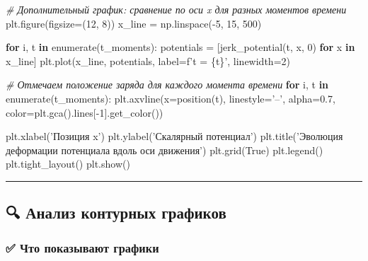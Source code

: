 \documentclass[11pt]{article}
\newenvironment{Shaded}{}{}
\newcommand{\KeywordTok}[1]{\textcolor[rgb]{0.00,0.44,0.13}{\textbf{{#1}}}}
\newcommand{\DecValTok}[1]{\textcolor[rgb]{0.25,0.63,0.44}{{#1}}}
\newcommand{\FloatTok}[1]{\textcolor[rgb]{0.25,0.63,0.44}{{#1}}}
\newcommand{\StringTok}[1]{\textcolor[rgb]{0.25,0.44,0.63}{{#1}}}
\newcommand{\CommentTok}[1]{\textcolor[rgb]{0.38,0.63,0.69}{\textit{{#1}}}}
\newcommand{\NormalTok}[1]{{#1}}
\newcommand{\SpecialCharTok}[1]{\textcolor[rgb]{0.25,0.44,0.63}{{#1}}}
\newcommand{\SpecialStringTok}[1]{\textcolor[rgb]{0.73,0.40,0.53}{{#1}}}
\newcommand{\VariableTok}[1]{\textcolor[rgb]{0.10,0.09,0.49}{{#1}}}
\newcommand{\ControlFlowTok}[1]{\textcolor[rgb]{0.00,0.44,0.13}{\textbf{{#1}}}}
\newcommand{\OperatorTok}[1]{\textcolor[rgb]{0.40,0.40,0.40}{{#1}}}
\newcommand{\BuiltInTok}[1]{{#1}}
\begin{document}
\begin{Shaded}
\begin{Highlighting}[]
\CommentTok{# Дополнительный график: сравнение по оси x для разных моментов времени}
\NormalTok{plt.figure(figsize}\OperatorTok{=}\NormalTok{(}\DecValTok{12}\NormalTok{, }\DecValTok{8}\NormalTok{))}
\NormalTok{x_line }\OperatorTok{=}\NormalTok{ np.linspace(}\OperatorTok{-}\DecValTok{5}\NormalTok{, }\DecValTok{15}\NormalTok{, }\DecValTok{500}\NormalTok{)}

\ControlFlowTok{for}\NormalTok{ i, t }\KeywordTok{in} \BuiltInTok{enumerate}\NormalTok{(t_moments):}
\NormalTok{    potentials }\OperatorTok{=}\NormalTok{ [jerk_potential(t, x, }\DecValTok{0}\NormalTok{) }\ControlFlowTok{for}\NormalTok{ x }\KeywordTok{in}\NormalTok{ x_line]}
\NormalTok{    plt.plot(x_line, potentials, label}\OperatorTok{=}\SpecialStringTok{f't = }\SpecialCharTok{\{t\}}\SpecialStringTok{'}\NormalTok{, linewidth}\OperatorTok{=}\DecValTok{2}\NormalTok{)}

\CommentTok{# Отмечаем положение заряда для каждого момента времени}
\ControlFlowTok{for}\NormalTok{ i, t }\KeywordTok{in} \BuiltInTok{enumerate}\NormalTok{(t_moments):}
\NormalTok{    plt.axvline(x}\OperatorTok{=}\NormalTok{position(t), linestyle}\OperatorTok{=}\StringTok{'--'}\NormalTok{, alpha}\OperatorTok{=}\FloatTok{0.7}\NormalTok{, color}\OperatorTok{=}\NormalTok{plt.gca().lines[}\OperatorTok{-}\DecValTok{1}\NormalTok{].get_color())}

\NormalTok{plt.xlabel(}\StringTok{'Позиция x'}\NormalTok{)}
\NormalTok{plt.ylabel(}\StringTok{'Скалярный потенциал'}\NormalTok{)}
\NormalTok{plt.title(}\StringTok{'Эволюция деформации потенциала вдоль оси движения'}\NormalTok{)}
\NormalTok{plt.grid(}\VariableTok{True}\NormalTok{)}
\NormalTok{plt.legend()}
\NormalTok{plt.tight_layout()}
\NormalTok{plt.show()}
\end{Highlighting}
\end{Shaded}

\begin{center}\rule{0.5\linewidth}{\linethickness}\end{center}

\subsection{🔍 Анализ контурных
графиков}\label{ux430ux43dux430ux43bux438ux437-ux43aux43eux43dux442ux443ux440ux43dux44bux445-ux433ux440ux430ux444ux438ux43aux43eux432}

\subsubsection{✅ Что показывают
графики}\label{ux447ux442ux43e-ux43fux43eux43aux430ux437ux44bux432ux430ux44eux442-ux433ux440ux430ux444ux438ux43aux438}
\end{document}
